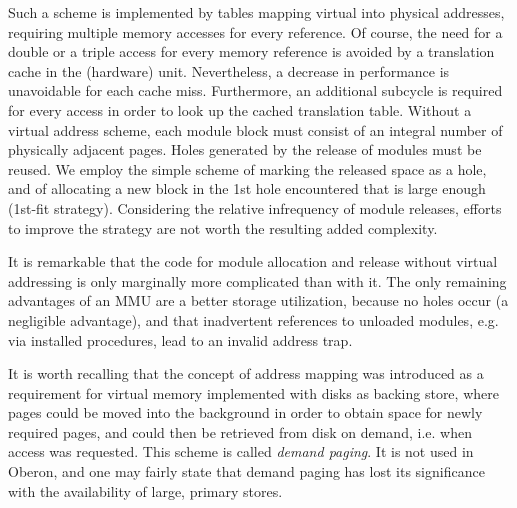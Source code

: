 Such a scheme is implemented by tables mapping virtual into physical addresses, requiring
multiple memory accesses for every reference. Of course, the need for a double or a triple
access for every memory reference is avoided by a translation cache in the (hardware) unit.
Nevertheless, a decrease in performance is unavoidable for each cache miss. Furthermore,
an additional subcycle is required for every access in order to look up the cached translation
table. Without a virtual address scheme, each module block must consist of an integral number
of physically adjacent pages. Holes generated by the release of modules must be reused. We
employ the simple scheme of marking the released space as a hole, and of allocating a new
block in the 1st hole encountered that is large enough (1st-fit strategy). Considering the
relative infrequency of module releases, efforts to improve the strategy are not worth the
resulting added complexity.

It is remarkable that the code for module allocation and release without virtual addressing
is only marginally more complicated than with it. The only remaining advantages of an MMU are a
better storage utilization, because no holes occur (a negligible advantage), and that inadvertent
references to unloaded modules, e.g. via installed procedures, lead to an invalid address trap.

It is worth recalling that the concept of address mapping was introduced as a requirement for
virtual memory implemented with disks as backing store, where pages could be moved into the
background in order to obtain space for newly required pages, and could then be retrieved from
disk on demand, i.e. when access was requested. This scheme is called \emph{demand paging}.
It is not used in Oberon, and one may fairly state that demand paging has lost its significance
with the availability of large, primary stores.

